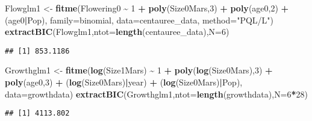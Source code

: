 \documentclass[
]{article}
\newenvironment{Shaded}{\begin{snugshade}}{\end{snugshade}}
\newcommand{\AttributeTok}[1]{\textcolor[rgb]{0.13,0.29,0.53}{#1}}
\newcommand{\DecValTok}[1]{\textcolor[rgb]{0.00,0.00,0.81}{#1}}
\newcommand{\FunctionTok}[1]{\textcolor[rgb]{0.13,0.29,0.53}{\textbf{#1}}}
\newcommand{\NormalTok}[1]{#1}
\newcommand{\OtherTok}[1]{\textcolor[rgb]{0.56,0.35,0.01}{#1}}
\newcommand{\SpecialCharTok}[1]{\textcolor[rgb]{0.81,0.36,0.00}{\textbf{#1}}}
\newcommand{\StringTok}[1]{\textcolor[rgb]{0.31,0.60,0.02}{#1}}
\begin{document}
\begin{Shaded}
\begin{Highlighting}[]
\NormalTok{Flowglm1 }\OtherTok{\textless{}{-}} \FunctionTok{fitme}\NormalTok{(Flowering0 }\SpecialCharTok{\textasciitilde{}}  \DecValTok{1} \SpecialCharTok{+} \FunctionTok{poly}\NormalTok{(Size0Mars,}\DecValTok{3}\NormalTok{) }\SpecialCharTok{+} \FunctionTok{poly}\NormalTok{(age0,}\DecValTok{2}\NormalTok{) }\SpecialCharTok{+}\NormalTok{ (age0}\SpecialCharTok{|}\NormalTok{Pop),}
                 \AttributeTok{family=}\NormalTok{binomial,}
                 \AttributeTok{data=}\NormalTok{centauree\_data, }\AttributeTok{method=}\StringTok{"PQL/L"}\NormalTok{)}
\FunctionTok{extractBIC}\NormalTok{(Flowglm1,}\AttributeTok{ntot=}\FunctionTok{length}\NormalTok{(centauree\_data),}\AttributeTok{N=}\DecValTok{6}\NormalTok{)}
\end{Highlighting}
\end{Shaded}

\begin{verbatim}
## [1] 853.1186
\end{verbatim}

\begin{Shaded}
\begin{Highlighting}[]
\NormalTok{Growthglm1 }\OtherTok{\textless{}{-}} \FunctionTok{fitme}\NormalTok{(}\FunctionTok{log}\NormalTok{(Size1Mars) }\SpecialCharTok{\textasciitilde{}} \DecValTok{1} \SpecialCharTok{+} \FunctionTok{poly}\NormalTok{(}\FunctionTok{log}\NormalTok{(Size0Mars),}\DecValTok{3}\NormalTok{) }\SpecialCharTok{+} \FunctionTok{poly}\NormalTok{(age0,}\DecValTok{3}\NormalTok{) }\SpecialCharTok{+}\NormalTok{ (}\FunctionTok{log}\NormalTok{(Size0Mars)}\SpecialCharTok{|}\NormalTok{year) }\SpecialCharTok{+}\NormalTok{ (}\FunctionTok{log}\NormalTok{(Size0Mars)}\SpecialCharTok{|}\NormalTok{Pop),}
                    \AttributeTok{data=}\NormalTok{growthdata)}
\FunctionTok{extractBIC}\NormalTok{(Growthglm1,}\AttributeTok{ntot=}\FunctionTok{length}\NormalTok{(growthdata),}\AttributeTok{N=}\DecValTok{6}\SpecialCharTok{*}\DecValTok{28}\NormalTok{)}
\end{Highlighting}
\end{Shaded}

\begin{verbatim}
## [1] 4113.802
\end{verbatim}
\end{document}
